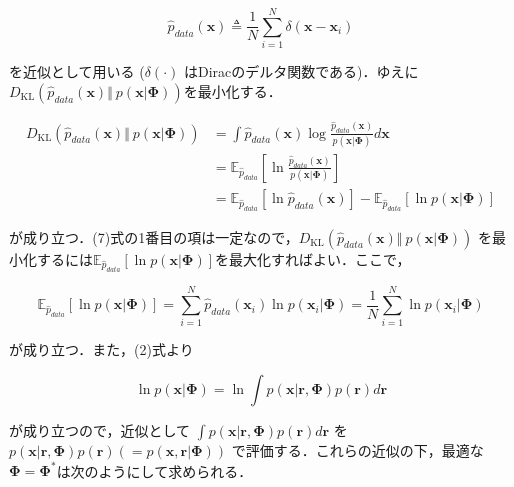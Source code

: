 \begin{equation}
\hat{p}_{data}(\mathbf{x})\triangleq\frac{1}{N}\sum_{i=1}^N \delta(\mathbf{x}-\mathbf{x}_i)
\end{equation}


を近似として用いる ($\delta(\cdot)$ はDiracのデルタ関数である)．ゆえに$D_{\text{KL}}\left(\hat{p}_{data}(\mathbf{x}) \Vert\ p(\mathbf{x}|\mathbf{\Phi})\right)$を最小化する．


\begin{align}
D_{\text{KL}}\left(\hat{p}_{data}(\mathbf{x}) \Vert\ p(\mathbf{x}|\mathbf{\Phi})\right)&=\int \hat{p}_{data}(\mathbf{x}) \log \frac{\hat{p}_{data}(\mathbf{x})}{p(\mathbf{x}|\mathbf{\Phi})} d\mathbf{x}\\
&=\mathbb{E}_{\hat{p}_{data}} \left[\ln \frac{\hat{p}_{data}(\mathbf{x})}{p(\mathbf{x}|\mathbf{\Phi})}\right]\\
&=\mathbb{E}_{\hat{p}_{data}} \left[\ln \hat{p}_{data}(\mathbf{x})\right]-\mathbb{E}_{\hat{p}_{data}} \left[\ln p(\mathbf{x}|\mathbf{\Phi})\right]
\end{align}


が成り立つ．(7)式の1番目の項は一定なので，$D_{\text{KL}}\left(\hat{p}_{data}(\mathbf{x}) \Vert\ p(\mathbf{x}|\mathbf{\Phi})\right)$ を最小化するには$\mathbb{E}_{\hat{p}_{data}} \left[\ln p(\mathbf{x}|\mathbf{\Phi})\right]$を最大化すればよい．ここで，


\begin{equation}
\mathbb{E}_{\hat{p}_{data}} \left[\ln p(\mathbf{x}|\mathbf{\Phi})\right]=\sum_{i=1}^N \hat{p}_{data}(\mathbf{x}_i)\ln p(\mathbf{x}_i|\mathbf{\Phi})=\frac{1}{N}\sum_{i=1}^N \ln p(\mathbf{x}_i|\mathbf{\Phi})
\end{equation}


が成り立つ．また，(2)式より


\begin{equation}
\ln p(\mathbf{x}|\mathbf{\Phi})=\ln \int p(\mathbf{x}|\mathbf{r}, \mathbf{\Phi})p(\mathbf{r})d\mathbf{r}
\end{equation}


が成り立つので，近似として $\displaystyle \int p(\mathbf{x}|\mathbf{r}, \mathbf{\Phi})p(\mathbf{r})d\mathbf{r}$ を $p(\mathbf{x}|\mathbf{r}, \mathbf{\Phi})p(\mathbf{r}) \left(=p(\mathbf{x}, \mathbf{r}| \mathbf{\Phi})\right)$ で評価する．これらの近似の下，最適な$\mathbf{\Phi}=\mathbf{\Phi}^*$は次のようにして求められる．


